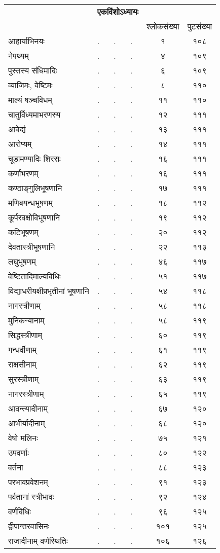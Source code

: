 \documentclass[11pt, openany]{book}
\begin{document}
\newpage

\begin{center}
\begin{tabular}{m{10em} m{2em} m{2em} m{2em} c c}
& \multicolumn{3}{c}{\textbf{\large एकविंशोऽध्यायः}} & \\
& & & & श्लोकसंख्या & पुटसंख्या\\
आहार्याभिनयः& .& .& .&१ &१०८\\
नेपथ्यम्& .& .& .&४ &१०९\\
पुस्तस्य संधिमादिः& .& .& .&६ &१०९\\
व्याजिमः, वेष्टिमः& .& .& .&८ &११०\\
माल्यं षञ्चविधम्& .& .& .&११ &११०\\
चातुर्विध्यमाभरणस्य& .& .& .&१२& १११\\
आवेद्यं& .& .& .&१३& १११\\
आरोप्यम्& .& .& .&१४ &१११\\
चूडामण्यादिः शिरसः& .& .& .&१६ &१११\\
कर्णाभरणम्& .& .& .&१६ &१११\\
कण्ठाङ्गुलिभूषणानि& .& .& .&१७ &१११\\
मणिबयन्धभूषणम्& .& .& .&१८ &११२\\
कूर्परवक्षोविभूषणानि& .& .& .&१९ &११२\\
कटिभूषणम्& .& .& .&२० &११२\\
देवतास्त्रीभूषणानि& .& .& .&२२ &११३\\
लघुभूषणम्& .& .& .&४६ &११७\\
वेष्टितादिमाल्यविधिः& .& .& .&५१& ११७\\
विद्याधरीयक्षीप्रभृतीनां भूषणानि& .& .& .&५४ &११८\\
नागस्त्रीणाम्& .& .& .&५८ &११८\\
मुनिकन्यानाम्& .& .& .&५८ &११९\\
सिद्धस्त्रीणाम्& .& .& .&६०& ११९\\
गन्धर्वीणाम्& .& .& .&६१ &११९\\
राक्षसीनाम्& .& .& .&६२ &११९\\
सुरस्त्रीणाम्& .& .& .&६३ &११९\\
नागरस्त्रीणाम्& .& .& .&६५ &११९\\
आवन्त्यादीनाम्& .& .& .&६७ &१२०\\
आभीर्यादीनाम्& .& .& .&६८ &१२०\\
वेषो मलिनः& .& .& .&७५ &१२१\\
उपवर्णाः& .& .& .&८० &१२२\\
वर्तना& .& .& .&८८ &१२३\\
परभावप्रवेशनम्& .& .& .&९१ &१२३\\
पर्वतानां स्त्रीभावः& .& .& .&९२ &१२४\\
वर्णविधिः& .& .& .&९६ &१२५\\
द्वीपान्तरवासिनः& .& .& .&१०१ &१२५\\
राजादीनाम् वर्णस्थितिः& .& .& .&१०६& १२६
\end{tabular}
\end{center}
\end{document}
